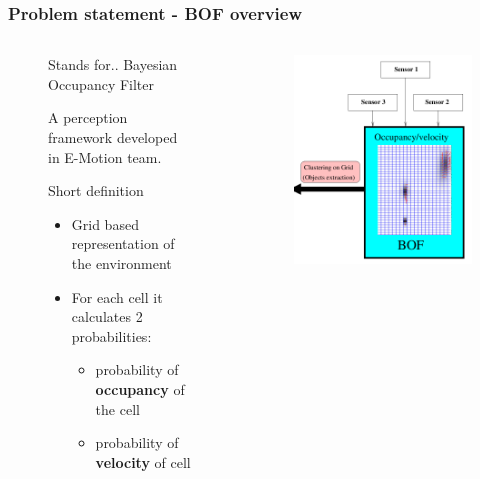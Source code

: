 \documentclass{beamer}
\begin{document}
	
	\begin{frame}
		\frametitle{Problem statement - BOF overview}
	\small
		  \begin{columns}[t]
		  \begin{column}{5cm}
			\begin{figure}[h]
			\center
	
		\begin{block}{Stands for..}
			Bayesian Occupancy Filter
			
			A perception framework developed in E-Motion team.  \cite{coue2003}
		\end{block}
	
			\begin{block}{Short definition}
			\begin{itemize}		
				 \item Grid based representation of the environment
				 \item For each cell it calculates 2 probabilities:
			 		\begin{itemize}		
				 		\item probability of \textbf{occupancy} of the cell
				 		\item probability of \textbf{velocity} of cell
	 				\end{itemize}		
				 
			\end{itemize}				
			\end{block}
		\end{figure}	
		  \end{column}
		  
		  \begin{column}{5cm}
			\begin{figure}[h]
			\center
			\includegraphics[scale=0.3]{img/bof}
		\end{figure}	
		  \end{column}
		 \end{columns}
		
	\end{frame}
\end{document}
